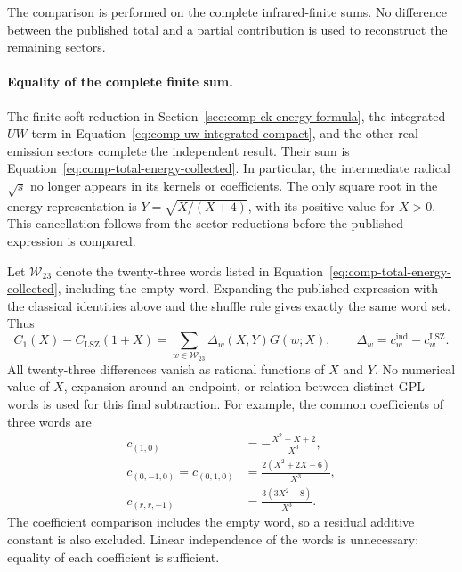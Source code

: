The comparison is performed on the complete infrared-finite sums.
No difference between the published total and a partial contribution is
used to reconstruct the remaining sectors.

\paragraph{Equality of the complete finite sum.}
The finite soft reduction in Section~\ref{sec:comp-ck-energy-formula},
the integrated $UW$ term in Equation~\eqref{eq:comp-uw-integrated-compact},
and the other real-emission sectors complete the independent result.
Their sum is Equation~\eqref{eq:comp-total-energy-collected}.
In particular, the intermediate radical $\sqrt{s}$ no longer appears
in its kernels or coefficients. The only square root in the energy
representation is $Y=\sqrt{X/(X+4)}$, with its positive value for $X>0$.
This cancellation follows from the sector reductions before the
published expression is compared.

Let $\mathcal W_{23}$ denote the twenty-three words listed in
Equation~\eqref{eq:comp-total-energy-collected}, including the empty word.
Expanding the published expression with the classical identities above
and the shuffle rule gives exactly the same word set. Thus
\begin{equation}
 C_1(X)-C_{\mathrm{LSZ}}(1+X)
 =\sum_{w\in\mathcal W_{23}}\Delta_w(X,Y)G(w;X),\qquad
 \Delta_w=c_w^{\mathrm{ind}}-c_w^{\mathrm{LSZ}}.
\end{equation}
All twenty-three differences vanish as rational functions of $X$ and $Y$.
No numerical value of $X$, expansion around an endpoint, or relation
between distinct GPL words is used for this final subtraction.
For example, the common coefficients of three words are
\begin{align}
 c_{(1,0)}&=-\frac{X^2-X+2}{X^3},\\
 c_{(0,-1,0)}=c_{(0,1,0)}&=\frac{2(X^2+2X-6)}{X^3},\\
 c_{(r,r,-1)}&=\frac{3(3X^2-8)}{X^3}.
\end{align}
The coefficient comparison includes the empty word, so a residual
additive constant is also excluded. Linear independence of the words
is unnecessary: equality of each coefficient is sufficient.

